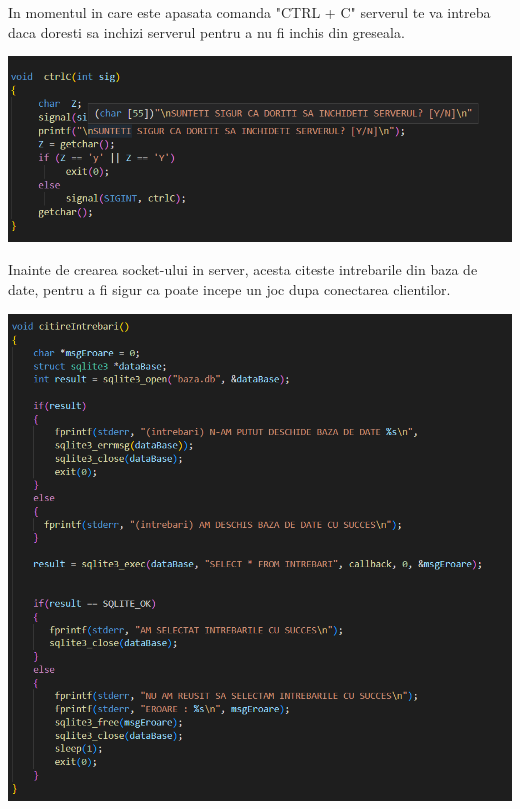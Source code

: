 \documentclass{article}
\begin{document}
In momentul in care este apasata comanda "CTRL + C" serverul te va intreba daca doresti sa inchizi serverul pentru a nu fi inchis din greseala.

\begin{center}
\vspace{0.3cm}
\includegraphics[scale=0.5]{server1}
\vspace{0.3cm}
\end{center}

Inainte de crearea socket-ului in server, acesta citeste intrebarile din baza de date, pentru a fi sigur ca poate incepe un joc dupa conectarea clientilor.

\begin{center}
\vspace{0.3cm}
\includegraphics[scale=0.5]{server2}
\vspace{0.3cm}
\end{center}
\end{document}

